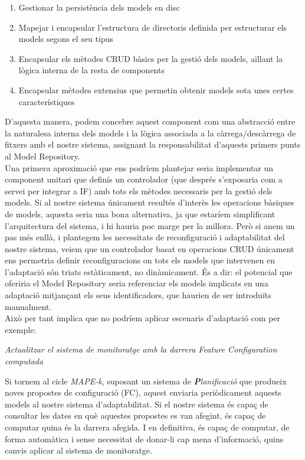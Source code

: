 \begin{enumerate}
\item Gestionar la persistència dels models en disc
\item Mapejar i encapsular l'estructura de directoris definida per estructurar els models segons el seu tipus
\item Encapsular els mètodes CRUD bàsics per la gestió dels models, aïllant la lògica interna de la resta de components
\item Encapsular mètodes extensius que permetin obtenir models sota unes certes característiques
\end{enumerate}

D'aquesta manera, podem concebre aquest component com una abstracció entre la naturalesa interna dels models i la lògica associada a la càrrega/descàrrega de fitxers amb el nostre sistema, assignant la responsabilitat d'aquests primers punts al Model Repository.\\

Una primera aproximació que ens podríem plantejar seria implementar un component unitari que definís un controlador (que després s'exposaria com a servei per integrar a IF) amb tots els mètodes necessaris per la gestió dels models. Si al nostre sistema únicament resultés d'interès les operacions bàsiques de models, aquesta seria una bona alternativa, ja que estaríem simplificant l'arquitectura del sistema, i hi hauria poc marge per la millora. Però si anem un pas més enllà, i plantegem les necessitats de reconfiguració i adaptabilitat del nostre sistema, veiem que un controlador basat en operacions CRUD únicament ens permetria definir reconfiguracions on tots els models que intervenen en l'adaptació són triats estàticament, no dinàmicament. És a dir: el potencial que oferiria el Model Repository seria referenciar els models implicats en una adaptació mitjançant els seus identificadors, que haurien de ser introduïts manualment.\\

Això per tant implica que no podríem aplicar escenaris d'adaptació com per exemple:\\

\centerline{\textit{Actualitzar el sistema de monitoratge amb la darrera Feature Configuration computada}}\bigskip

Si tornem al cicle \textit{MAPE-k}, suposant un sistema de \textit{\textbf{P}lanificació} que produeix noves propostes de configuració (FC), aquest enviaria periòdicament aquests models al nostre sistema d'adaptabilitat. Si el nostre sistema és capaç de consultar les dates en què aquestes propostes es van afegint, és capaç de computar quina és la darrera afegida. I en definitiva, és capaç de computar, de forma automàtica i sense necessitat de donar-li cap mena d'informació, quins canvis aplicar al sistema de monitoratge.\\

